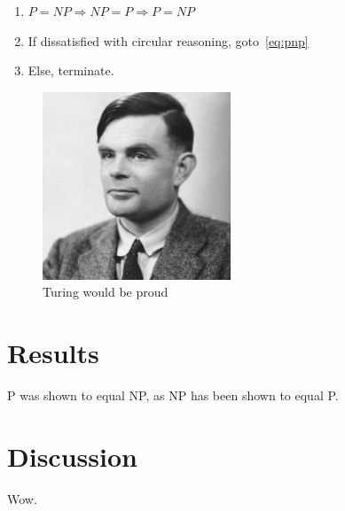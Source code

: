 \documentclass[a4paper]{article}
\begin{document}
\begin{enumerate}
\item \label{eq:pnp}$P=NP \Rightarrow NP=P \Rightarrow P=NP $
\item If dissatisfied with circular reasoning, goto~\ref{eq:pnp}
\item Else, terminate.
\end{enumerate}

\begin{figure}[h!]
  \centering
  \includegraphics[width=0.5\textwidth]{img/turing-portrait.jpg}
  \caption{Turing would be proud}
  \label{fig:turing}
\end{figure}

\section{Results} %

P was shown to equal NP, as NP has been shown to equal P.

\section{Discussion} %

Wow.

\printbibliography
\end{document}
